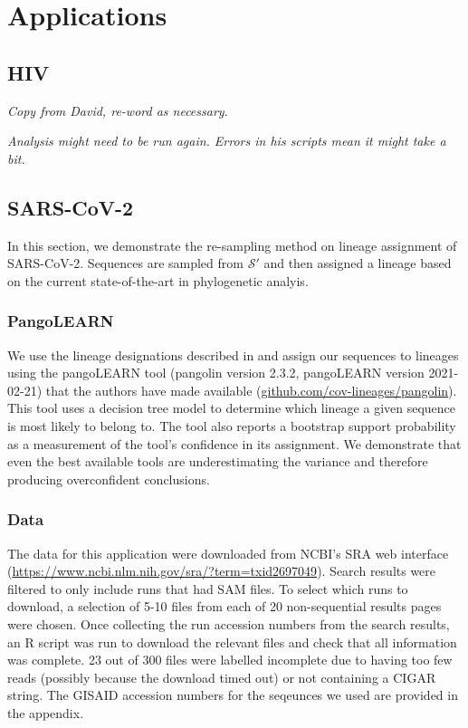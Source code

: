\documentclass[
]{article}
\newcommand{\nps}{\mathcal{S}} %
\begin{document}
\hypertarget{applications}{%
\section{Applications}\label{applications}}

\hypertarget{hiv}{%
\subsection{HIV}\label{hiv}}

\emph{Copy from David, re-word as necessary.}

\emph{Analysis might need to be run again. Errors in his scripts mean it
might take a bit.}

\hypertarget{sars-cov-2}{%
\subsection{SARS-CoV-2}\label{sars-cov-2}}

In this section, we demonstrate the re-sampling method on lineage
assignment of SARS-CoV-2. Sequences are sampled from \(\nps'\) and then
assigned a lineage based on the current state-of-the-art in phylogenetic
analyis.

\hypertarget{pangolearn}{%
\subsubsection{PangoLEARN}\label{pangolearn}}

We use the lineage designations described in
\citet{rambautDynamicNomenclatureProposal2020} and assign our sequences
to lineages using the pangoLEARN tool (pangolin version 2.3.2,
pangoLEARN version 2021-02-21) that the authors have made available
(\url{github.com/cov-lineages/pangolin}). This tool uses a decision tree
model to determine which lineage a given sequence is most likely to
belong to. The tool also reports a bootstrap support probability as a
measurement of the tool's confidence in its assignment. We demonstrate
that even the best available tools are underestimating the variance and
therefore producing overconfident conclusions.

\hypertarget{data}{%
\subsubsection{Data}\label{data}}

The data for this application were downloaded from NCBI's SRA web
interface (\url{https://www.ncbi.nlm.nih.gov/sra/?term=txid2697049}).
Search results were filtered to only include runs that had SAM files. To
select which runs to download, a selection of 5-10 files from each of 20
non-sequential results pages were chosen. Once collecting the run
accession numbers from the search results, an R script was run to
download the relevant files and check that all information was complete.
23 out of 300 files were labelled incomplete due to having too few reads
(possibly because the download timed out) or not containing a CIGAR
string. The GISAID accession numbers for the seqeunces we used are
provided in the appendix.
\end{document}
